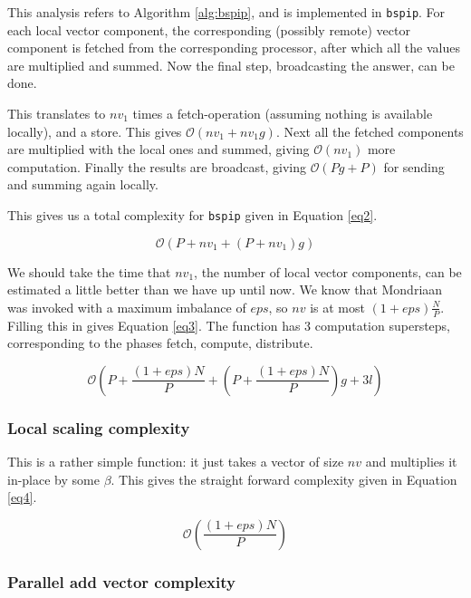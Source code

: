 \documentclass[a4paper]{article}
\begin{document}
This analysis refers to Algorithm \ref{alg:bspip}, and is
implemented in \texttt{bspip}. For each local vector component,
the corresponding (possibly remote) vector component is fetched
from the corresponding processor, after which all the values
are multiplied and summed. Now the final step, broadcasting the answer,
can be done.

This translates to $nv_1$ times a fetch-operation (assuming nothing is
available locally), and a store. This gives $\ensuremath{\mathcal{O}}(nv_1 + nv_1 g)$. Next
all the fetched components are multiplied with the local ones and summed,
giving $\ensuremath{\mathcal{O}}(nv_1)$ more computation. Finally the results are broadcast,
giving $\ensuremath{\mathcal{O}}(P g + P)$ for sending and summing again locally.

This gives us a total complexity for \texttt{bspip} given in Equation \ref{eq2}.

\begin{equation}
   \mathcal{O}(P + nv_1 + (P + nv_1) g)
    \label{eq2}
\end{equation}

We should take the time that $nv_1$, the number of local vector
components, can be estimated a little better than we have up until now.
We know that Mondriaan was invoked with a maximum imbalance of $eps$,
so $nv$ is at most $(1+eps)\frac{N}{P}$. Filling this in gives Equation \ref{eq3}. The function has 3 computation supersteps, corresponding to the phases fetch, compute, distribute.

\begin{equation}
   \mathcal{O}\left(P + \frac{\left(1+eps\right)N}{P} + \left(P + \frac{(1+eps)N}{P}\right) g + 3l\right)
    \label{eq3}
\end{equation}

\subsubsection{Local scaling complexity}

This is a rather simple function: it just takes a vector of size
$nv$ and multiplies it in-place by some $\beta$. This gives the
straight forward complexity given in Equation \ref{eq4}.

\begin{equation}
   \mathcal{O}\left( \frac{\left(1+eps\right)N}{P}\right)
    \label{eq4}
\end{equation}

\subsubsection{Parallel add vector complexity}
\end{document}
